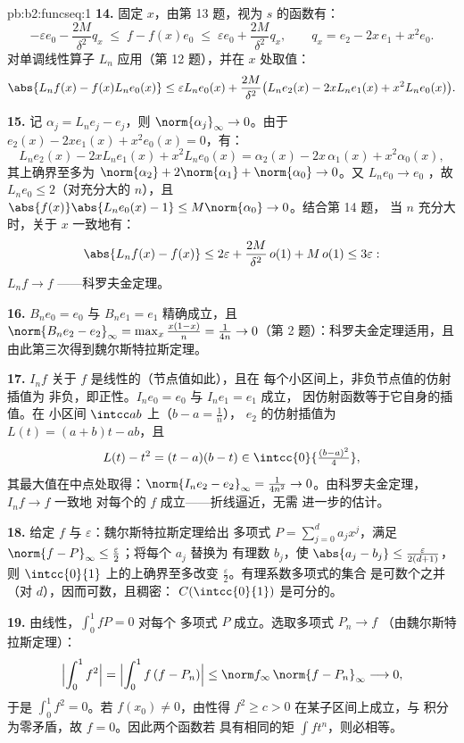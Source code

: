 \begin{solution}{pb:b2:funcseq:1}
\textbf{14.} 固定 $x$，由第 13 题，视为 $s$ 的函数有：
\[
-\varepsilon e_0 - \frac{2M}{\delta^2}q_x
\;\leq\; f - f(x)e_0
\;\leq\; \varepsilon e_0 + \frac{2M}{\delta^2}q_x,
\qquad q_x = e_2 - 2x\,e_1 + x^2e_0 .
\]
对单调线性算子 $L_n$ 应用（第 12 题），并在
$x$ 处取值：
\[
\abs{L_nf(x) - f(x)L_ne_0(x)}
\leq \varepsilon L_ne_0(x)
+ \frac{2M}{\delta^2}\bigl(L_ne_2(x) - 2xL_ne_1(x)
+ x^2L_ne_0(x)\bigr) .
\]

\textbf{15.} 记 $\alpha_j = L_ne_j - e_j$，则
$\norm{\alpha_j}_\infty \to 0$。由于 $e_2(x) - 2xe_1(x) +
x^2e_0(x) = 0$，有：
\[
L_ne_2(x) - 2xL_ne_1(x) + x^2L_ne_0(x)
= \alpha_2(x) - 2x\,\alpha_1(x) + x^2\alpha_0(x),
\]
其上确界至多为 $\norm{\alpha_2} + 2\norm{\alpha_1} +
\norm{\alpha_0} \to 0$。又 $L_ne_0 \to e_0$ ，故
$L_ne_0 \leq 2$（对充分大的 $n$），且 $\abs{f(x)}\abs{L_ne_0(x) -
1} \leq M\norm{\alpha_0} \to 0$。结合第 14 题，
当 $n$ 充分大时，关于 $x$ 一致地有：
\[
\abs{L_nf(x) - f(x)} \leq 2\varepsilon +
\frac{2M}{\delta^2}\,o(1) + M\,o(1) \leq 3\varepsilon :
\]
$L_nf \to f$ ——科罗夫金定理。

\textbf{16.} $B_ne_0 = e_0$ 与 $B_ne_1 = e_1$ 精确成立，且
$\norm{B_ne_2 - e_2}_\infty = \max_x\frac{x(1-x)}{n} =
\frac{1}{4n} \to 0$（第 2 题）：科罗夫金定理适用，且
由此第三次得到魏尔斯特拉斯定理。

\textbf{17.} $I_nf$ 关于 $f$ 是线性的（节点值如此），且在
每个小区间上，非负节点值的仿射插值为
非负，即正性。$I_ne_0 = e_0$ 与 $I_ne_1 = e_1$ 成立，
因仿射函数等于它自身的插值。在
小区间 $\intcc ab$ 上（$b - a = \frac1n$），
$e_2$ 的仿射插值为 $L(t) = (a+b)t - ab$，且
\[
L(t) - t^2 = (t-a)(b-t) \in
\intcc{0}{\tfrac{(b-a)^2}{4}} ,
\]
其最大值在中点处取得：$\norm{I_ne_2 - e_2}_\infty =
\frac{1}{4n^2} \to 0$。由科罗夫金定理，$I_nf \to f$ 一致地
对每个的 $f$ 成立——折线逼近，无需
进一步的估计。

\textbf{18.} 给定 $f$ 与 $\varepsilon$：魏尔斯特拉斯定理给出
多项式 $P = \sum_{j=0}^d a_jx^j$，满足 $\norm{f -
P}_\infty \leq \frac\varepsilon2$；将每个 $a_j$ 替换为
有理数 $b_j$，使 $\abs{a_j - b_j} \leq
\frac{\varepsilon}{2(d+1)}$，则
$\intcc{0}{1}$ 上的上确界至多改变 $\frac\varepsilon2$。有理系数多项式的集合
是可数个之并（对
$d$），因而可数，且稠密：
$C(\intcc{0}{1})$ 是可分的。

\textbf{19.} 由线性，$\int_0^1 fP = 0$ 对每个
多项式 $P$ 成立。选取多项式 $P_n \to f$ 
（由魏尔斯特拉斯定理）：
\[
\Bigl|\int_0^1 f^2\Bigr|
= \Bigl|\int_0^1 f\,(f - P_n)\Bigr|
\leq \norm f_\infty\,\norm{f - P_n}_\infty
\longrightarrow 0 ,
\]
于是 $\int_0^1 f^2 = 0$。若 $f(x_0) \neq 0$，由性得
$f^2 \geq c > 0$ 在某子区间上成立，与
积分为零矛盾，故 $f = 0$。因此两个函数若
具有相同的矩 $\int f t^n$，则必相等。


\end{solution}
